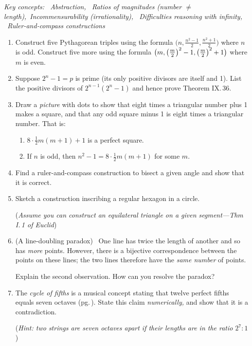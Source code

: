 \begin{exercises}{}{}	
	\hangindent\leftmargini\emph{Key concepts: \ Abstraction, \ Ratios of magnitudes (number $\neq$ length),\ Incommensurability (irrationality), \ Difficulties reasoning with infinity, \ Ruler-and-compass constructions}
	
	\begin{enumerate}
	  \item %
	Construct five Pythagorean triples using the formula $\bigl(n,\frac{n^2-1}2,\frac{n^2+1}2\bigr)$ where $n$ is odd. Construct five more using the formula $\bigl(m,\left(\frac{m}{2}\right)^2-1,\left(\frac{m}{2}\right)^2+1\bigr)$ where $m$ is even.
	
	  \item Suppose $2^n-1=p$ is prime (its only positive divisors are itself and 1). List the positive divisors of $2^{n-1}(2^n-1)$ and hence prove Theorem IX.\,36.
	  
	  \item%
	  Draw a \emph{picture} with dots to show that eight times a triangular number plus 1 makes a square, and that any odd square minus 1 is eight times a triangular number. That is:
	  \begin{enumerate}
	    \item $8\cdot\frac 12m(m+1)+1$ is a perfect square.
	    \item If $n$ is odd, then $n^2-1=8\cdot\frac 12m(m+1)$ for some $m$.
	  \end{enumerate}
	  
	  \item%
	  Find a ruler-and-compass construction to bisect a given angle and show that it is correct.
	 
	  \item%
	  Sketch a construction inscribing a regular hexagon in a circle.\par
	  (\emph{Assume you can construct an equilateral triangle on a given segment---Thm I.\,1 of Euclid})
	  
		\item (A line-doubling paradox) \ One line has twice the length of another and so has \emph{more} points. However, there is a bijective correspondence between the points on these lines; the two lines therefore have the \emph{same number} of points.\par
		Explain the second observation. How can you resolve the paradox?
	
	
		\item The \emph{cycle of fifths} is a musical concept stating that twelve perfect fifths equals seven octaves (pg.\,\pageref{pg:pythagtuning}). State this claim \emph{numerically,} and show that it is a contradiction.\par
		(\emph{Hint: two strings are seven octaves apart if their lengths are in the ratio $2^7:1$})
		

\end{enumerate}
\end{exercises}
